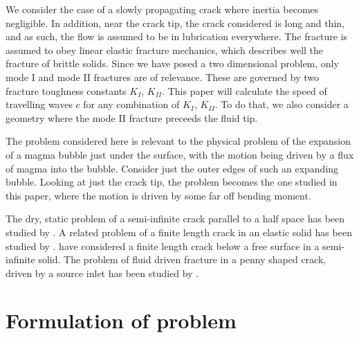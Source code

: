 \documentclass{jfm}
\begin{document}
We consider the case of a slowly propagating crack where inertia becomes 
negligible. In addition, near the crack tip, the crack considered is long and 
thin, and as such, the flow is assumed to be in lubrication everywhere. The 
fracture is assumed to obey linear elastic fracture mechanics, which describes 
well the fracture of brittle solids. Since we have posed a two dimensional 
problem, only mode I and mode II fractures are of relevance. These are governed 
by two fracture toughness constants $K_I$, $K_{II}$. This paper will calculate 
the speed of travelling waves $c$ for any combination of $K_I$, $K_{II}$. To 
do that, we also consider a geometry where the mode II fracture preceeds the 
fluid tip. 

The problem considered here is relevant to the physical problem of the 
expansion of a magma bubble just under the surface, with the motion being 
driven by a flux of magma into the bubble. Consider just the outer edges of 
such an expanding bubble. Looking at just the crack tip, the problem becomes 
the one studied in this paper, where the motion is driven by some far off 
bending moment.

The dry, static problem of a semi-infinite crack parallel to a half space has 
been studied by \citet{Zlatin}. A related problem of a finite length crack in 
an elastic solid has been studied by \citet{Thouless}. \citet{Dyskin} have 
considered a finite length crack below a free surface in a semi-infinite solid. 
The problem of fluid driven fracture in a penny shaped crack, driven by a 
source inlet has been studied by \citet{Garagash}.

%
% 
\section{Formulation of problem}\label{sec:formulation_of_problem}
%
%
\end{document}
